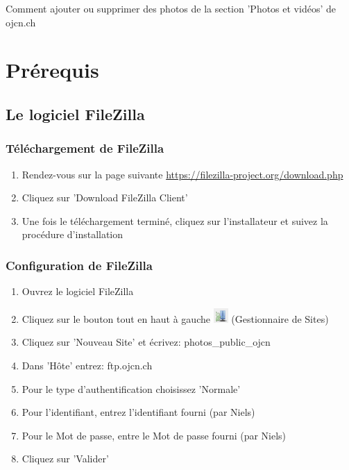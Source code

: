 \documentclass[10pt,a4paper]{article}
\begin{document}
\begin{center}
{\Huge Comment ajouter ou supprimer des photos de la section 'Photos et vidéos' de ojcn.ch}
\end{center}

\section{Prérequis}
\subsection{Le logiciel FileZilla}
\subsubsection{Téléchargement de FileZilla}

\begin{enumerate}
\item Rendez-vous sur la page suivante \url{https://filezilla-project.org/download.php}
\item Cliquez sur 'Download FileZilla Client'
\item Une fois le téléchargement terminé, cliquez sur l'installateur et suivez la procédure d'installation
\end{enumerate}

\subsubsection{Configuration de FileZilla}

\begin{enumerate}
\item Ouvrez le logiciel FileZilla
\item Cliquez sur le bouton tout en haut à gauche \includegraphics[scale=1]{images/gestionnaire_de_sites.png} (Gestionnaire de Sites)
\item Cliquez sur 'Nouveau Site' et écrivez: photos\_public\_ojcn
\item Dans 'Hôte' entrez: ftp.ojcn.ch
\item Pour le type d'authentification choisissez 'Normale'
\item Pour l'identifiant, entrez l'identifiant fourni (par Niels)
\item Pour le Mot de passe, entre le Mot de passe fourni (par Niels)
\item Cliquez sur 'Valider'
\end{enumerate}
\end{document}
